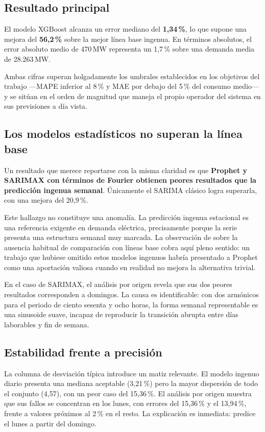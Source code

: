 \subsection*{Resultado principal}

El modelo XGBoost alcanza un error mediano del \textbf{1,34\,\%}, lo que supone
una mejora del \textbf{56,2\,\%} sobre la mejor línea base ingenua. En términos
absolutos, el error absoluto medio de 470\,MW representa un 1,7\,\% sobre una
demanda media de 28.263\,MW.

Ambas cifras superan holgadamente los umbrales establecidos en los objetivos del
trabajo —MAPE inferior al 8\,\% y MAE por debajo del 5\,\% del consumo medio— y
se sitúan en el orden de magnitud que maneja el propio operador del sistema en
sus previsiones a día vista.

\subsection*{Los modelos estadísticos no superan la línea base}

Un resultado que merece reportarse con la misma claridad es que \textbf{Prophet y
SARIMAX con términos de Fourier obtienen peores resultados que la predicción
ingenua semanal}. Únicamente el SARIMA clásico logra superarla, con una mejora del
20,9\,\%.

Este hallazgo no constituye una anomalía. La predicción ingenua estacional es una
referencia exigente en demanda eléctrica, precisamente porque la serie presenta
una estructura semanal muy marcada. La observación de
\textcite{hong2016probabilistic} sobre la ausencia habitual de comparación con
líneas base cobra aquí pleno sentido: un trabajo que hubiese omitido estos
modelos ingenuos habría presentado a Prophet como una aportación valiosa cuando
en realidad no mejora la alternativa trivial.

En el caso de SARIMAX, el análisis por origen revela que sus dos peores
resultados corresponden a domingos. La causa es identificable: con dos armónicos
para el periodo de ciento sesenta y ocho horas, la forma semanal representable es
una sinusoide suave, incapaz de reproducir la transición abrupta entre días
laborables y fin de semana.

\subsection*{Estabilidad frente a precisión}

La columna de desviación típica introduce un matiz relevante. El modelo ingenuo
diario presenta una mediana aceptable (3,21\,\%) pero la mayor dispersión de todo
el conjunto (4,57), con un peor caso del 15,36\,\%. El análisis por origen muestra
que sus fallos se concentran en los lunes, con errores del 15,36\,\% y el
13,94\,\%, frente a valores próximos al 2\,\% en el resto. La explicación es
inmediata: predice el lunes a partir del domingo.

